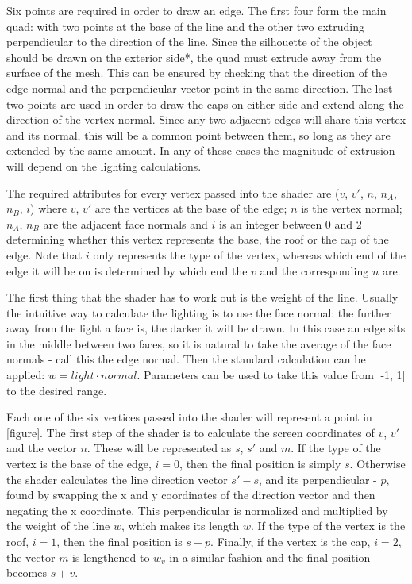 \documentclass[a4paper, 12pt]{article}
\begin{document}
Six points are required in order to draw an edge. The first four form the main quad: with two points at the base of the line and the other two extruding perpendicular to the direction of the line. Since the silhouette of the object should be drawn on the exterior side*, the quad must extrude away from the surface of the mesh. This can be ensured by checking that the direction of the edge normal and the perpendicular vector point in the same direction. The last two points are used in order to draw the caps on either side and extend along the direction of the vertex normal. Since any two adjacent edges will share this vertex and its normal, this will be a common point between them, so long as they are extended by the same amount. In any of these cases the magnitude of extrusion will depend on the lighting calculations.

The required attributes for every vertex passed into the shader are ($v$, $v'$, $n$, $n_A$, $n_B$, $i$) where $v$, $v'$ are the vertices at the base of the edge; $n$ is the vertex normal; $n_A$, $n_B$ are the adjacent face normals and $i$ is an integer between 0 and 2 determining whether this vertex represents the base, the roof or the cap of the edge. Note that $i$ only represents the type of the vertex, whereas which end of the edge it will be on is determined by which end the $v$ and the corresponding $n$ are.

The first thing that the shader has to work out is the weight of the line. Usually the intuitive way to calculate the lighting is to use the face normal: the further away from the light a face is, the darker it will be drawn. In this case an edge sits in the middle between two faces, so it is natural to take the average of the face normals - call this the edge normal. Then the standard calculation can be applied: $w = light \cdot normal$. Parameters can be used to take this value from [-1, 1] to the desired range.

Each one of the six vertices passed into the shader will represent a point in [figure]. The first step of the shader is to calculate the screen coordinates of  $v$, $v'$ and the vector $n$. These will be represented as $s$, $s'$ and $m$. If the type of the vertex is the base of the edge, $i=0$, then the final position is simply $s$. Otherwise the shader calculates the line direction vector $s'-s$, and its perpendicular - $p$, found by swapping the x and y coordinates of the direction vector and then negating the x coordinate. This perpendicular is normalized and multiplied by the weight of the line $w$, which makes its length $w$. If the type of the vertex is the roof, $i=1$, then the final position is $s+p$. Finally, if the vertex is the cap, $i=2$, the vector $m$ is lengthened to $w_v$ in a similar fashion and the final position becomes $s+v$.
\end{document}
